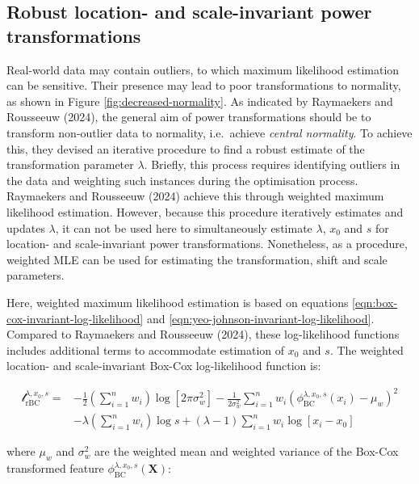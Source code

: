 \documentclass[
  a4paper,
]{article}
\begin{document}
\subsection{Robust location- and scale-invariant power
transformations}\label{robust-location--and-scale-invariant-power-transformations}

Real-world data may contain outliers, to which maximum likelihood
estimation can be sensitive. Their presence may lead to poor
transformations to normality, as shown in Figure
\ref{fig:decreased-normality}. As indicated by Raymaekers and Rousseeuw
(2024), the general aim of power transformations should be to transform
non-outlier data to normality, i.e.~achieve \emph{central normality}. To
achieve this, they devised an iterative procedure to find a robust
estimate of the transformation parameter \(\lambda\). Briefly, this
process requires identifying outliers in the data and weighting such
instances during the optimisation process. Raymaekers and Rousseeuw
(2024) achieve this through weighted maximum likelihood estimation.
However, because this procedure iteratively estimates and updates
\(\lambda\), it can not be used here to simultaneously estimate
\(\lambda\), \(x_0\) and \(s\) for location- and scale-invariant power
transformations. Nonetheless, as a procedure, weighted MLE can be used
for estimating the transformation, shift and scale parameters.

Here, weighted maximum likelihood estimation is based on equations
\ref{eqn:box-cox-invariant-log-likelihood} and
\ref{eqn:yeo-johnson-invariant-log-likelihood}. Compared to Raymaekers
and Rousseeuw (2024), these log-likelihood functions includes additional
terms to accommodate estimation of \(x_0\) and \(s\). The weighted
location- and scale-invariant Box-Cox log-likelihood function is:

\begin{equation}
\label{eqn:box-cox-weighted-invariant-log-likelihood}
\begin{split}
\mathcal{l}_{\text{rBC}}^{\lambda, x_0, s} = & -\frac{1}{2} \left(\sum_{i=1}^n w_i \right) \log \left[ 2 \pi \sigma_w^2 \right] -\frac{1}{2 \sigma_w^2} \sum_{i=1}^n w_i \left( \phi_{\text{BC}}^{\lambda, x_0, s}(x_i) - \mu_w \right)^2 \\
& - \lambda \left( \sum_{i=1}^n w_i \right) \log s + \left( \lambda - 1 \right) \sum_{i=1}^n w_i \log \left[ x_i - x_0 \right]
\end{split}
\end{equation}

where \(\mu_w\) and \(\sigma^2_w\) are the weighted mean and weighted
variance of the Box-Cox transformed feature
\(\phi_{\text{BC}}^{\lambda, x_0, s} (\mathbf{X})\):
\end{document}
